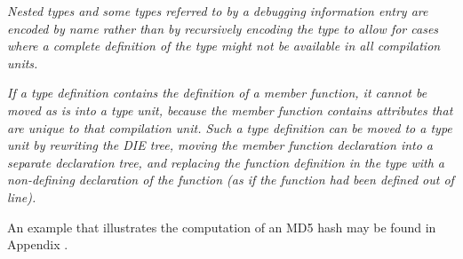 \textit{Nested types and some types referred to by a debugging 
information entry are encoded by name rather than by recursively 
encoding the type to allow for cases where a complete definition 
of the type might not be available in all compilation units.}

\textit{If a type definition contains the definition of a member function, 
it cannot be moved as is into a type unit, because the member function 
contains attributes that are unique to that compilation unit. 
Such a type definition can be moved to a type unit by rewriting the DIE tree, 
moving the member function declaration into a separate declaration tree, 
and replacing the function definition in the type with a non-defining 
declaration of the function (as if the function had been defined out of 
line).}

An example that illustrates the computation of an MD5 hash may be found in 
Appendix .


